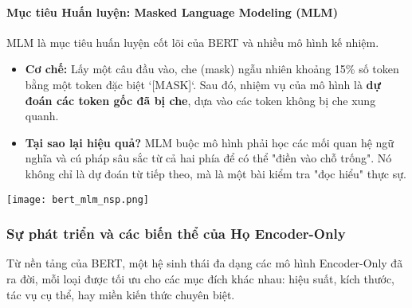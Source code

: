 \paragraph{Mục tiêu Huấn luyện: Masked Language Modeling (MLM)}
MLM là mục tiêu huấn luyện cốt lõi của BERT và nhiều mô hình kế nhiệm.
\begin{itemize}
    \item \textbf{Cơ chế:} Lấy một câu đầu vào, che (mask) ngẫu nhiên khoảng 15\% số token bằng một token đặc biệt `[MASK]`. Sau đó, nhiệm vụ của mô hình là \textbf{dự đoán các token gốc đã bị che}, dựa vào các token không bị che xung quanh.
    \item \textbf{Tại sao lại hiệu quả?} MLM buộc mô hình phải học các mối quan hệ ngữ nghĩa và cú pháp sâu sắc từ cả hai phía để có thể "điền vào chỗ trống". Nó không chỉ là dự đoán từ tiếp theo, mà là một bài kiểm tra "đọc hiểu" thực sự.
\end{itemize}

\begin{center}
    \texttt{[image: bert\_mlm\_nsp.png]}
    \label{fig:bert_mlm_nsp}
\end{center}

\subsubsection{Sự phát triển và các biến thể của Họ Encoder-Only}
Từ nền tảng của BERT, một hệ sinh thái đa dạng các mô hình Encoder-Only đã ra đời, mỗi loại được tối ưu cho các mục đích khác nhau: hiệu suất, kích thước, tác vụ cụ thể, hay miền kiến thức chuyên biệt.

